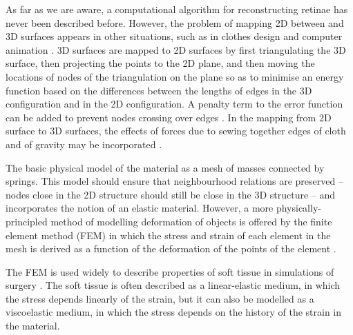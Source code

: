 \documentclass[10pt]{article}
\begin{document}
As far as we are aware, a computational algorithm for reconstructing
retinae has never been described before. However, the problem of
mapping 2D between and 3D surfaces appears in other situations, such
as in clothes design and computer animation
\cite{FanEtal98spri,MaCaEtal99flat,WangEtal02surf}. 3D surfaces are
mapped to 2D surfaces by first triangulating the 3D surface, then
projecting the points to the 2D plane, and then moving the locations
of nodes of the triangulation on the plane so as to minimise an
energy function based on the differences between the lengths of edges
in the 3D configuration and in the 2D configuration. A penalty term
to the error function can be added to prevent nodes crossing over
edges \cite{WangEtal02surf}. In the mapping from 2D surface to 3D
surfaces, the effects of forces due to sewing together edges of cloth
and of gravity may be incorporated \cite{FanEtal98spri}.

The basic physical model of the material as a mesh of masses connected
by springs. This model should ensure that neighbourhood relations are
preserved -- nodes close in the 2D structure should still be close in
the 3D structure -- and incorporates the notion of an elastic
material. However, a more physically-principled method of modelling
deformation of objects is offered by the finite element method (FEM)
in which the stress and strain of each element in the mesh is derived
as a function of the deformation of the points of the element
\cite{ZienTayl00fini}.

The FEM is used widely to describe properties of soft tissue in
simulations of surgery \cite{CartEtal05appl}. The soft tissue is
often described as a linear-elastic medium, in which the stress
depends linearly of the strain, but it can also be modelled as a
viscoelastic medium, in which the stress depends on the history of the
strain in the material. 


\end{document}
